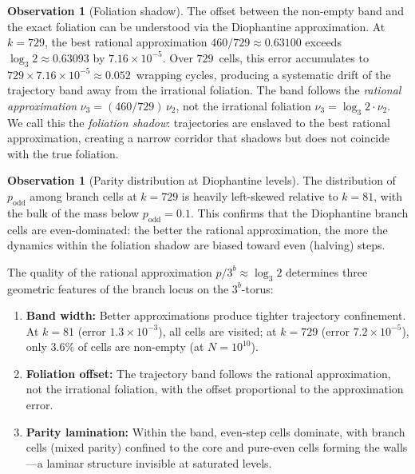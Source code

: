 \documentclass[11pt,a4paper]{article}
\theoremstyle{plain}
\theoremstyle{definition}
\newtheorem{observation}[theorem]{Observation}
\begin{document}
\begin{observation}[Foliation shadow]
\label{obs:foliation-shadow}
    The offset between the non-empty band and the exact foliation can
    be understood via the Diophantine approximation.  At $k = 729$,
    the best rational approximation $460/729 \approx 0.63100$ exceeds
    $\log_3 2 \approx 0.63093$ by $7.16 \times 10^{-5}$.  Over
    $729$~cells, this error accumulates to
    $729 \times 7.16 \times 10^{-5} \approx 0.052$~wrapping cycles,
    producing a systematic drift of the trajectory band away from the
    irrational foliation.  The band follows the \emph{rational
    approximation} $\nu_3 = (460/729)\,\nu_2$, not the irrational
    foliation $\nu_3 = \log_3 2 \cdot \nu_2$.  We call this the
    \emph{foliation shadow}: trajectories are enslaved to the best
    rational approximation, creating a narrow corridor that shadows but
    does not coincide with the true foliation.
\end{observation}

\begin{observation}[Parity distribution at Diophantine levels]
\label{obs:dioph-parity}
    The distribution of $p_{\mathrm{odd}}$ among branch cells at
    $k = 729$ is heavily left-skewed relative to $k = 81$, with the
    bulk of the mass below $p_{\mathrm{odd}} = 0.1$.  This confirms
    that the Diophantine branch cells are even-dominated: the better
    the rational approximation, the more the dynamics within the
    foliation shadow are biased toward even (halving) steps.
\end{observation}

\begin{keyinsight}
    The quality of the rational approximation $p/3^b \approx \log_3 2$
    determines three geometric features of the branch locus on the
    $3^b$-torus:
    \begin{enumerate}[label=(\roman*)]
        \item \textbf{Band width:} Better approximations produce
        tighter trajectory confinement.  At $k = 81$ (error
        $1.3 \times 10^{-3}$), all cells are visited; at $k = 729$
        (error $7.2 \times 10^{-5}$), only $3.6\%$ of cells are
        non-empty (at $N = 10^{10}$).
        \item \textbf{Foliation offset:} The trajectory band follows
        the rational approximation, not the irrational foliation,
        with the offset proportional to the approximation error.
        \item \textbf{Parity lamination:} Within the band, even-step
        cells dominate, with branch cells (mixed parity) confined to
        the core and pure-even cells forming the walls---a laminar
        structure invisible at saturated levels.
    \end{enumerate}
\end{keyinsight}
\end{document}
